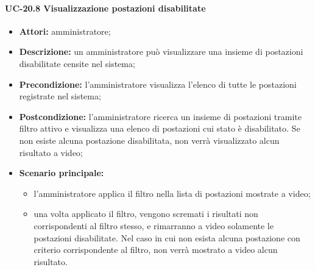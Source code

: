 \paragraph{UC-20.8 Visualizzazione postazioni disabilitate}
\begin{itemize}
    \item \textbf{Attori:} amministratore;
    \item \textbf{Descrizione:} un amministratore pu\`{o} visualizzare una insieme di postazioni disabilitate censite nel sistema;
    \item \textbf{Precondizione:} l'amministratore visualizza l'elenco di tutte le postazioni registrate nel sistema;
    \item \textbf{Postcondizione:} l'amministratore ricerca un insieme di postazioni tramite filtro attivo e visualizza una elenco di postazioni cui stato è disabilitato. Se non esiste alcuna postazione disabilitata, non verrà visualizzato alcun risultato a video;
    \item \textbf{Scenario principale:}
    \begin{itemize}
        \item l'amministratore applica il filtro nella lista di postazioni mostrate a video;
        \item una volta applicato il filtro, vengono scremati i risultati non corrispondenti al filtro stesso, e rimarranno a video solamente le postazioni disabilitate. Nel caso in cui non esista alcuna postazione con criterio corrispondente al filtro, non verrà mostrato a video alcun risultato.
    \end{itemize}
\end{itemize}
    
